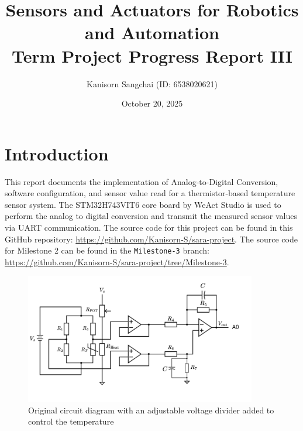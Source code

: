 \documentclass[12pt,a4paper]{article}
\title{Sensors and Actuators for Robotics and
Automation\\Term Project Progress Report III}
\author{Kanisorn Sangchai (ID: 6538020621)}
\date{October 20, 2025}
\begin{document}
\maketitle

\section{Introduction}
This report documents the implementation of Analog-to-Digital Conversion, software configuration, and sensor value read for a thermistor-based temperature sensor system. The STM32H743VIT6 core board by WeAct Studio is used to perform the analog to digital conversion and transmit the measured sensor values via UART communication. The source code for this project can be found in this GitHub repository: \url{https://github.com/Kanisorn-S/sara-project}. The source code for Milestone 2 can be found in the \texttt{Milestone-3} branch: \url{https://github.com/Kanisorn-S/sara-project/tree/Milestone-3}.

\begin{figure}[h]
    \centering
    \includegraphics[width=0.9\textwidth]{images/circuit_diagram.png}
    \caption{Original circuit diagram with an adjustable voltage divider added to control the temperature}
    \label{fig:circuit}
\end{figure}
\end{document}
